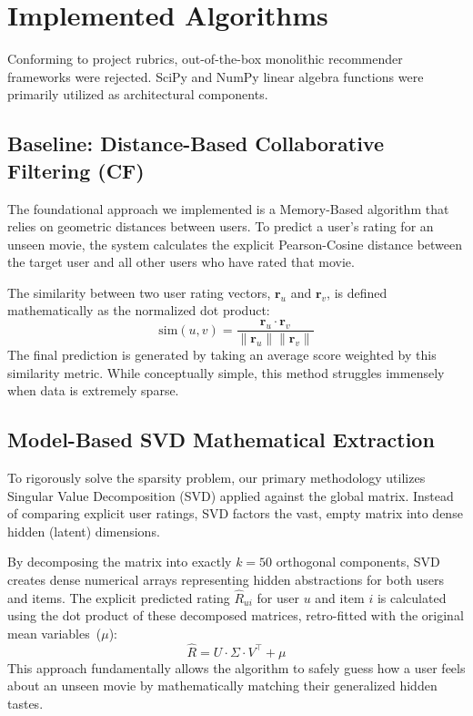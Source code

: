 \documentclass[sigconf,authordraft,nonacm]{acmart}
\begin{document}
\section{Implemented Algorithms}
Conforming to project rubrics, out-of-the-box monolithic recommender frameworks were rejected. SciPy and NumPy linear algebra functions were primarily utilized as architectural components.

\subsection{Baseline: Distance-Based Collaborative Filtering (CF)}
The foundational approach we implemented is a Memory-Based algorithm that relies on geometric distances between users. To predict a user's rating for an unseen movie, the system calculates the explicit Pearson-Cosine distance between the target user and all other users who have rated that movie. 

The similarity between two user rating vectors, $\mathbf{r}_u$ and $\mathbf{r}_v$, is defined mathematically as the normalized dot product:
\begin{equation}
\text{sim}(u, v) = \frac{\mathbf{r}_u \cdot \mathbf{r}_v}{\|\mathbf{r}_u\| \|\mathbf{r}_v\|}
\end{equation}
The final prediction is generated by taking an average score weighted by this similarity metric. While conceptually simple, this method struggles immensely when data is extremely sparse.

\subsection{Model-Based SVD Mathematical Extraction}
To rigorously solve the sparsity problem, our primary methodology utilizes Singular Value Decomposition (SVD) applied against the global matrix. Instead of comparing explicit user ratings, SVD factors the vast, empty matrix into dense hidden (latent) dimensions. 

By decomposing the matrix into exactly $k=50$ orthogonal components, SVD creates dense numerical arrays representing hidden abstractions for both users and items. The explicit predicted rating $\hat{R}_{ui}$ for user $u$ and item $i$ is calculated using the dot product of these decomposed matrices, retro-fitted with the original mean variables~($\mu$):
\begin{equation}
\hat{R} = U \cdot \Sigma \cdot V^\top + \mu
\end{equation}
This approach fundamentally allows the algorithm to safely guess how a user feels about an unseen movie by mathematically matching their generalized hidden tastes.
\end{document}

